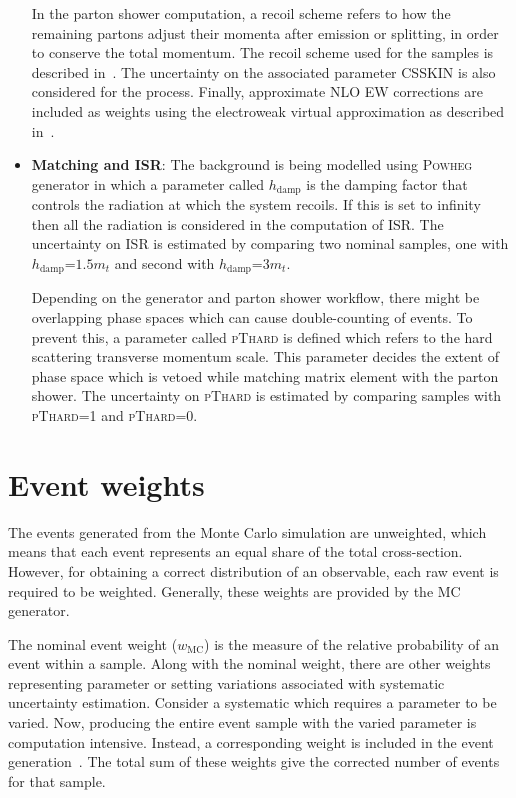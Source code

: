 \begin{itemize}
  In the parton shower computation, a recoil scheme refers to how the remaining partons adjust their
  momenta after emission or splitting, in order to conserve the total momentum. The recoil scheme used
  for the \diboson samples is described in~\cite{Schumann:2007mg}. The uncertainty on the associated parameter CSSKIN is 
  also considered for the \diboson process. Finally, approximate NLO EW corrections are included as weights using
  the electroweak virtual approximation as described in~\cite{Kallweit2015}. 

  \item \textbf{Matching and ISR}: The \ttbar background is being modelled using \textsc{Powheg}
  generator in which a parameter called $h_{\text{damp}}$ is the damping factor that controls the radiation
  at which the \ttbar system recoils. If this is set to infinity then all the radiation is considered
  in the computation of ISR. The uncertainty on ISR is estimated by comparing two nominal \ttbar 
  samples, one with $h_{\text{damp}}$=$1.5m_t$ and second with $h_{\text{damp}}$=$3m_t$.

  Depending on the generator and parton shower workflow, there might be overlapping phase spaces
  which can cause double-counting of events. To prevent this, a parameter called \textsc{pThard} is defined 
  which refers to the hard scattering transverse momentum scale. This parameter decides the extent of 
  phase space which is vetoed while matching matrix element with the parton shower. 
  The uncertainty on \textsc{pThard} is estimated
  by comparing samples with \textsc{pThard}=1 and \textsc{pThard}=0.
\end{itemize}
\label{sec:systdescribe2}

\section{Event weights}
The events generated from the Monte Carlo simulation are unweighted, which means that each event 
represents an equal share of the total cross-section. However, for obtaining a correct distribution
of an observable, each raw event is required to be weighted. Generally, these weights are provided by the
MC generator.

The nominal event weight ($w_{\text{MC}}$) is the measure of the relative probability of an event 
within a sample. Along with the nominal weight, there are other weights representing parameter or
setting variations associated with systematic uncertainty estimation. Consider a systematic which 
requires a parameter to be varied. Now, producing the entire event sample with the varied 
parameter is computation intensive. Instead, a corresponding weight is included in the event 
generation~\cite{10.21468/SciPostPhysCodeb.8}. The total sum of these weights give the 
corrected number of events for that sample. 

